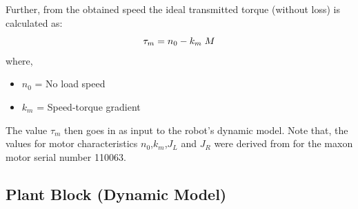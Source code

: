 \documentclass[a4paper,12pt]{report}
\begin{document}
Further, from the obtained speed the ideal transmitted torque (without loss) is calculated as:
\begin{equation}
\tau_m = n_0 - k_m \hspace{1mm}M
\end{equation}
where,
\begin{itemize}
	\renewcommand\labelitemi{--}
	\item $ n_0 $ = No load speed
	\item $ k_m $ = Speed-torque gradient
\end{itemize}
The value $ \tau_m $ then goes in as input to the robot's dynamic model. Note that, the values for motor characteristics $ n_0 $,$ k_m $,$ J_L $ and $ J_R $ were derived from \cite{maxon-motor-data} for the maxon motor serial number 110063.

\subsection{Plant Block (Dynamic Model)}
\label{plant-block}
\end{document}
